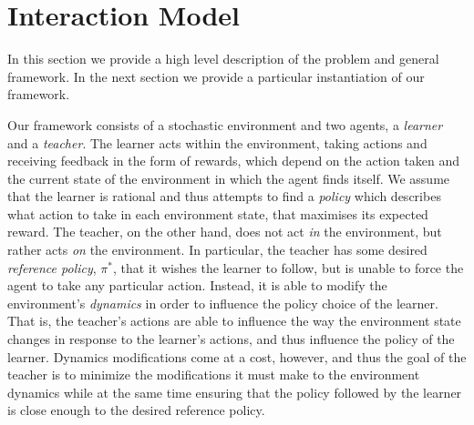 \documentclass[letterpaper]{aamas2009}
\begin{document}

\section{Interaction Model}\label{sec: GeneralModel}

In this section we provide a high level description of the problem and general framework.
In the next section we provide a particular instantiation of our framework.

Our framework consists of a stochastic environment and two agents, a \emph{learner} and a 
\emph{teacher}.   The learner acts within the environment, taking actions and receiving feedback in 
the form of rewards, which depend on the action taken and the current state of the environment in 
which the agent finds itself.  We assume that the learner is rational and thus attempts to find a 
\emph{policy} which describes what action to take in each environment state,  that maximises its 
expected reward.  The teacher, on the other hand, does not act \emph{in} the environment, but rather acts \emph{on} the environment.  In particular, the teacher has some desired \emph{reference policy}, $\pi^*$, that it wishes the learner to follow, but is unable to force the agent to take any particular action.  Instead, it is able to modify the environment's \emph{dynamics} in order to  influence the policy choice of the learner. That is, the teacher's actions are able to influence the way the environment state changes in response to the learner's actions, and thus influence the policy of the learner. Dynamics modifications come at a cost, however, and thus the goal of the teacher is to minimize the modifications it must make to the environment dynamics while at the same time ensuring that the policy followed by the learner is close enough to the desired reference policy.
\end{document}

